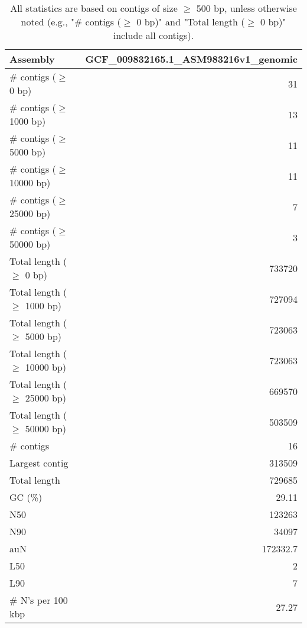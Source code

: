 \documentclass[12pt,a4paper]{article}
\begin{document}
\begin{table}[ht]
\begin{center}
\caption{All statistics are based on contigs of size $\geq$ 500 bp, unless otherwise noted (e.g., "\# contigs ($\geq$ 0 bp)" and "Total length ($\geq$ 0 bp)" include all contigs).}
\begin{tabular}{|l*{1}{|r}|}
\hline
Assembly & GCF\_009832165.1\_ASM983216v1\_genomic \\ \hline
\# contigs ($\geq$ 0 bp) & 31 \\ \hline
\# contigs ($\geq$ 1000 bp) & 13 \\ \hline
\# contigs ($\geq$ 5000 bp) & 11 \\ \hline
\# contigs ($\geq$ 10000 bp) & 11 \\ \hline
\# contigs ($\geq$ 25000 bp) & 7 \\ \hline
\# contigs ($\geq$ 50000 bp) & 3 \\ \hline
Total length ($\geq$ 0 bp) & 733720 \\ \hline
Total length ($\geq$ 1000 bp) & 727094 \\ \hline
Total length ($\geq$ 5000 bp) & 723063 \\ \hline
Total length ($\geq$ 10000 bp) & 723063 \\ \hline
Total length ($\geq$ 25000 bp) & 669570 \\ \hline
Total length ($\geq$ 50000 bp) & 503509 \\ \hline
\# contigs & 16 \\ \hline
Largest contig & 313509 \\ \hline
Total length & 729685 \\ \hline
GC (\%) & 29.11 \\ \hline
N50 & 123263 \\ \hline
N90 & 34097 \\ \hline
auN & 172332.7 \\ \hline
L50 & 2 \\ \hline
L90 & 7 \\ \hline
\# N's per 100 kbp & 27.27 \\ \hline
\end{tabular}
\end{center}
\end{table}
\end{document}
